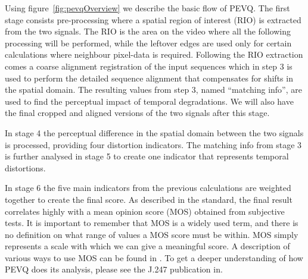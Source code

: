 Using figure~\ref{fig:pevqOverview} we describe the basic flow of PEVQ. The first stage consists pre-processing where a spatial region of interest (RIO) is extracted from the two signals. The RIO is the area on the video where all the following processing will be performed, while the leftover edges are used only for certain calculations where neighbour pixel-data is required. Following the RIO extraction comes a coarse alignment registration of the input sequences which in step 3 is used to perform the detailed sequence alignment that compensates for shifts in the spatial domain. The resulting values from step 3, named \enquote{matching info}, are used to find the perceptual impact of temporal degradations. We will also have the final cropped and aligned versions of the two signals after this stage.

In stage 4 the perceptual difference in the spatial domain between the two signals is processed, providing four distortion indicators. The matching info from stage 3 is further analysed in stage 5 to create one indicator that represents temporal distortions. 

In stage 6 the five main indicators from the previous calculations are weighted together to create the final score. As described in the standard, the final result correlates highly with a mean opinion score (MOS) obtained from subjective tests. It is important to remember that MOS is a widely used term, and there is no definition on what range of values a MOS score must be within. MOS simply represents a scale with which we can give a meaningful score. A description of various ways to use MOS can be found in \cite{p800}. To get a deeper understanding of how PEVQ does its analysis, please see the J.247 publication in\cite{j.247}.
